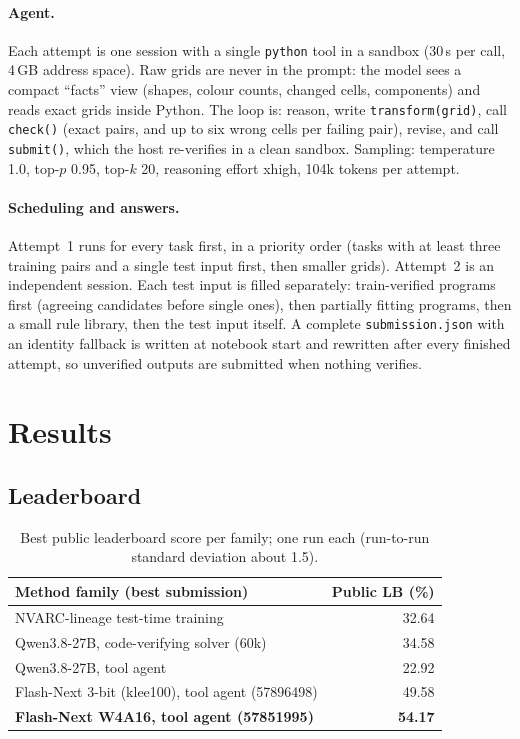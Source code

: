 \documentclass[11pt]{article}
\begin{document}
\paragraph{Agent.} Each attempt is one session with a single \texttt{python} tool in a sandbox (30\,s per call, 4\,GB address space). Raw grids are never in the prompt: the model sees a compact ``facts'' view (shapes, colour counts, changed cells, components) and reads exact grids inside Python. The loop is: reason, write \texttt{transform(grid)}, call \texttt{check()} (exact pairs, and up to six wrong cells per failing pair), revise, and call \texttt{submit()}, which the host re-verifies in a clean sandbox. Sampling: temperature 1.0, top-$p$ 0.95, top-$k$ 20, reasoning effort xhigh, 104k tokens per attempt.

\paragraph{Scheduling and answers.} Attempt~1 runs for every task first, in a priority order (tasks with at least three training pairs and a single test input first, then smaller grids). Attempt~2 is an independent session. Each test input is filled separately: train-verified programs first (agreeing candidates before single ones), then partially fitting programs, then a small rule library, then the test input itself. A complete \texttt{submission.json} with an identity fallback is written at notebook start and rewritten after every finished attempt, so unverified outputs are submitted when nothing verifies.

\section{Results}
\subsection{Leaderboard}
\begin{table}[tbp]
\centering\small
\begin{tabular}{@{}lr@{}}
\toprule
Method family (best submission) & Public LB (\%) \\
\midrule
NVARC-lineage test-time training & 32.64 \\
Qwen3.8-27B, code-verifying solver (60k) & 34.58 \\
Qwen3.8-27B, tool agent & 22.92 \\
Flash-Next 3-bit (klee100), tool agent (57896498) & 49.58 \\
\textbf{Flash-Next W4A16, tool agent (57851995)} & \textbf{54.17} \\
\bottomrule
\end{tabular}
\caption{Best public leaderboard score per family; one run each (run-to-run standard deviation about 1.5).}
\label{tab:lb}
\end{table}
\end{document}
